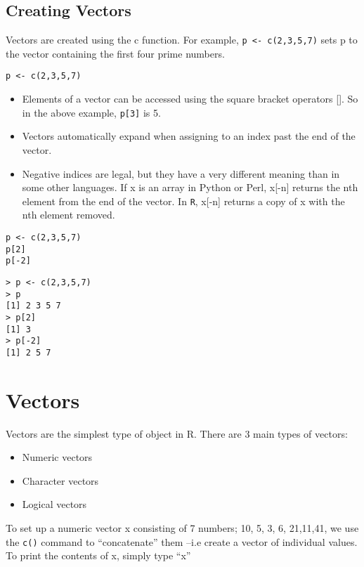 \documentclass[a4paper,12pt]{article}
\begin{document}
\subsection{Creating Vectors}
Vectors are created using the c function. For example, \texttt{p <- c(2,3,5,7)} sets p to the vector containing the first four prime numbers.
\begin{framed}
\begin{verbatim}
p <- c(2,3,5,7)
\end{verbatim}
\end{framed}

\begin{itemize}
\item Elements of a vector can be accessed using the square bracket operators []. So in the above example, \texttt{p[3]} is 5.

\item Vectors automatically expand when assigning to an index past the end of the vector.

\item Negative indices are legal, but they have a very different meaning than in some other languages. If x is an array in Python or Perl, x[-n] returns the nth element from the end of the vector. In \texttt{R}, x[-n] returns a copy of x with the nth element removed.
\end{itemize}

\begin{framed}
\begin{verbatim}
p <- c(2,3,5,7)
p[2]
p[-2]
\end{verbatim}
\end{framed}

\begin{verbatim}
> p <- c(2,3,5,7)
> p
[1] 2 3 5 7
> p[2]
[1] 3
> p[-2]
[1] 2 5 7
\end{verbatim}


\newpage
\section{Vectors}
 Vectors are the simplest type of object in R. There are 3 main types of vectors:
\begin{itemize}
\item  Numeric vectors
\item Character vectors
\item Logical vectors
\end{itemize}
To set up a numeric vector x consisting of 7 numbers; {10, 5, 3, 6, 21,11,41}, we use the \texttt{c()} command to “concatenate” them –i.e create a vector of individual values.
To print the contents of x, simply type “x”
\end{document}

